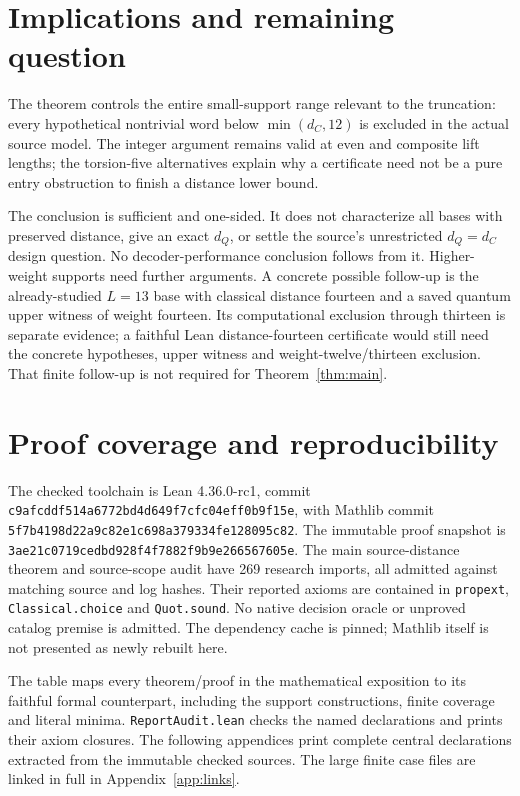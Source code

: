 \documentclass[11pt]{article}
\theoremstyle{definition}\newtheorem{definition}[theorem]{Definition}
\begin{document}
\section{Implications and remaining question}\label{sec:limits}
The theorem controls the entire small-support range relevant to the
truncation: every hypothetical nontrivial word below $\min(d_C,12)$ is
excluded in the actual source model. The integer argument remains valid
at even and composite lift lengths; the torsion-five alternatives explain
why a certificate need not be a pure entry obstruction to finish a distance
lower bound.

The conclusion is sufficient and one-sided. It does not characterize all
bases with preserved distance, give an exact $d_Q$, or settle the source's
unrestricted $d_Q=d_C$ design question. No decoder-performance conclusion
follows from it. Higher-weight supports need further arguments.
A concrete possible follow-up is the already-studied $L=13$ base with
classical distance fourteen and a saved quantum upper witness of weight
fourteen. Its computational exclusion through thirteen is separate evidence;
a faithful Lean distance-fourteen certificate would still need the concrete
hypotheses, upper witness and weight-twelve/thirteen exclusion. That finite
follow-up is not required for Theorem~\ref{thm:main}.

\appendix
\clearpage\section{Proof coverage and reproducibility}\label{app:coverage}
The checked toolchain is Lean 4.36.0-rc1, commit
\nolinkurl{c9afcddf514a6772bd4d649f7cfc04eff0b9f15e}, with Mathlib commit
\nolinkurl{5f7b4198d22a9c82e1c698a379334fe128095c82}.
The immutable proof snapshot is
\nolinkurl{3ae21c0719cedbd928f4f7882f9b9e266567605e}.
The main source-distance theorem and source-scope audit have 269 research
imports, all admitted against matching source and log hashes. Their reported
axioms are contained in \texttt{propext}, \texttt{Classical.choice} and
\texttt{Quot.sound}. No native decision oracle or unproved catalog premise
is admitted. The dependency cache is pinned; Mathlib itself is not presented
as newly rebuilt here.

The table maps every theorem/proof in the mathematical exposition to its
faithful formal counterpart, including the support constructions, finite
coverage and literal minima. \texttt{ReportAudit.lean} checks the named
declarations and prints their axiom closures. The following appendices print
complete central declarations extracted from the immutable checked sources.
The large finite case files are linked in full in Appendix~\ref{app:links}.
\begingroup\footnotesize\endgroup
\end{document}
